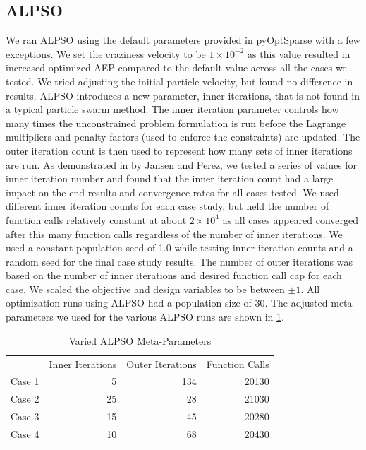 \documentclass[hidelinks,sort&compress,AMA,STIX1COL]{WileyNJD-v2}
\begin{document}
\subsection{ALPSO} 
We ran ALPSO using the default parameters provided in pyOptSparse\cite{wu2020} with a few exceptions.
We set the craziness velocity to be $1\times10^{-2}$ as this value resulted in increased optimized AEP compared to the default value across all the cases we tested. We tried adjusting the initial particle velocity, but found no difference in results. ALPSO introduces a new parameter, inner iterations, that is not found in a typical particle swarm method. The inner iteration parameter controls how many times the unconstrained problem formulation is run before the Lagrange multipliers and penalty factors (used to enforce the constraints) are updated. The outer iteration count is then used to represent how many sets of inner iterations are run. As demonstrated in by Jansen and Perez\cite{jansen2011_alpso}, we tested a series of values for inner iteration number and found that the inner iteration count had a large impact on the end results and convergence rates for all cases tested. We used different inner iteration counts for each case study, but held the number of function calls relatively constant at about $2\times 10^4$ as all cases appeared converged after this many function calls regardless of the number of inner iterations. We used a constant population seed of 1.0 while testing inner iteration counts and a random seed for the final case study results. The number of outer iterations was based on the number of inner iterations and desired function call cap for each case. We scaled the objective and design variables to be between $\pm1$.  All optimization runs using ALPSO had a population size of 30. The adjusted meta-parameters we used for the various ALPSO runs are shown in \cref{tab:alpsoparams}.

\begin{table}[h!]
	\centering
	\caption{Varied ALPSO Meta-Parameters}
	\label{tab:alpsoparams}
	\begin{tabular}{lrrr}
		\toprule
		{} & Inner Iterations & Outer Iterations & Function Calls\\
		\cmidrule(lr){2-4}
		Case 1 &  5  & 134 & 20130 \\
		Case 2 & 25 & 28  & 21030 \\
		Case 3 & 15 & 45 & 20280 \\
		Case 4 & 10 & 68 & 20430 \\
		\bottomrule
	\end{tabular}
\end{table}
\end{document}
